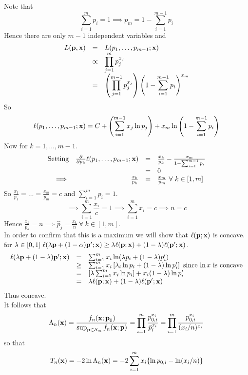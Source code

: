 \documentclass[11pt,a4paper]{article}
\begin{document}
Note that
$$\sum_{i=1}^mp_i=1\implies p_m=1-\sum_{i=1}^{m-1}p_i$$
Hence there are only $m-1$ independent variables and
\[\begin{array}{rcl}
L(\textbf{p},\textbf{x})&=&L(p_1,\dots,p_{m-1};\textbf{x})\\
&\propto&{\displaystyle \prod_{j=1}^mp_j^{x_j}}\\
&=&{\displaystyle\left(\prod_{j=1}^{m-1}p_j^{x_j}\right)\left(1-\sum_{i=1}^{m-1}p_i\right)^{x_m}}
\end{array}\]
So
$$\ell(p_1,\dots,p_{m-1};\textbf{x})=C+\left(\sum_{i=1}^{m-1}x_j\ln p_j\right)+x_m\ln\left(1-\sum_{i=1}^{m-1}p_i\right)$$
Now for $k=1,\dots,m-1$.\\
\[\begin{array}{rrcl}
\text{Setting}&\frac{\partial}{\partial p_k}\ell(p_1,\dots,p_{m-1};\x)&=&\frac{x_k}{p_k}-\frac{x_m}{1-\sum_{i=1}^{m-1}p_i}\\
&&=&0\\
\implies&\frac{x_k}{p_k}&=&\frac{x_m}{p_m}\ \forall\ k\in[1,m]
\end{array}\]
So $\frac{x_1}{p_1}=\dots=\frac{x_m}{p_m}=c$ and $\sum_{i=1}^mp_i=1$.\\
$$\implies\sum_{i=1}^m\frac{x_i}{c}=1\implies\sum_{i=1}^mx_i=c\implies n=c$$
Hence $\frac{x_k}{p_k}=n\implies\hat{p}_j=\frac{x_k}{n}\ \forall\ k\in[1,m]$.\\
In order to confirm that this is a maximum we will show that $\ell(\textbf{p};\textbf{x})$ is concave.\\
\ie for $\lambda\in[0,1]\ \ell(\lambda \textbf{p}+(1-\alpha)\textbf{p}';\textbf{x})\geq\lambda\ell(\textbf{p};\textbf{x})+(1-\lambda)\ell(\textbf{p}';\textbf{x})$.
\[\begin{array}{rcl}
\ell(\lambda\textbf{p}+(1-\lambda)\textbf{p}';\textbf{x})&=&\sum_{i=1}^mx_i\ln(\lambda p_i+(1-\lambda)p_i')\\
&\geq&\sum_{i=1}^mx_i\left[\lambda_i\ln p_i + (1-\lambda)\ln p_i'\right]\text{ since $\ln x$ is concave}\\
&=&[\lambda\sum_{i=1}^mx_i\ln p_i]+x_i(1-\lambda)\ln p'_i\\
&=&\lambda\ell(\textbf{p};\textbf{x})+(1-\lambda)\ell(\textbf{p}';\textbf{x})
\end{array}\]
Thus concave.\\
It follows that
$$\Lambda_n(\textbf{x})=\frac{f_n(\textbf{x};\textbf{p}_0)}{\sup_{\textbf{p}\in\mathcal{S}_m}f_n(\textbf{x};\textbf{p})}=\prod_{i=1}^m\frac{p_{0,i}^{x_i}}{\hat{p}_i^{x_i}}=\prod_{i=1}^m\frac{p_{0,i}^{x_i}}{(x_i/n)^{x_i}}$$
so that
$$T_n(\textbf{x})=-2\ln\Lambda_n(\textbf{x})=-2\sum_{i=1}^mx_i\{\ln p_{0,i}-\ln(x_i/n)\}$$
\end{document}
